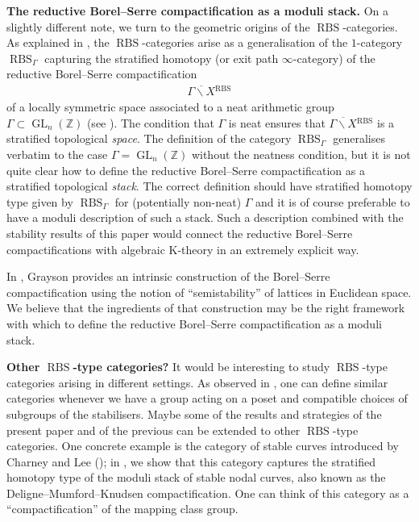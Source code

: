 \documentclass[12pt, reqno]{amsart}
\theoremstyle{plain}
\theoremstyle{definition}
\newcommand{\Z}{\mathbb Z}
\begin{document}
\medskip

\textbf{The reductive Borel--Serre compactification as a moduli stack.} On a slightly different note, we turn to the geometric origins of the $\operatorname{RBS}$-categories. As explained in \cite{ClausenOrsnesJansen}, the $\operatorname{RBS}$-categories arise as a generalisation of the $1$-category $\operatorname{RBS}_\Gamma$ capturing the stratified homotopy (or exit path $\infty$-category) of the reductive Borel--Serre compactification
\begin{align*}
\overline{\Gamma\backslash X}{}^{\operatorname{RBS}}
\end{align*}
of a locally symmetric space associated to a neat arithmetic group $\Gamma\subset \operatorname{GL}_n(\Z)$ (see \cite{OrsnesJansen,ClausenOrsnesJansen}). The condition that $\Gamma$ is neat ensures that $\overline{\Gamma\backslash X}{}^{\operatorname{RBS}}$ is a stratified topological \textit{space}. The definition of the category $\operatorname{RBS}_\Gamma$ generalises verbatim to the case $\Gamma=\operatorname{GL}_n(\Z)$ without the neatness condition, but it is not quite clear how to define the reductive Borel--Serre compactification as a stratified topological \textit{stack}. The correct definition should have stratified homotopy type given by $\operatorname{RBS}_\Gamma$ for (potentially non-neat) $\Gamma$ and it is of course preferable to have a moduli description of such a stack. Such a description combined with the stability results of this paper would connect the reductive Borel--Serre compactifications with algebraic K-theory in an extremely explicit way.

In \cite{Grayson84}, Grayson provides an intrinsic construction of the Borel--Serre compactification using the notion of ``semistability'' of lattices in Euclidean space. We believe that the ingredients of that construction may be the right framework with which to define the reductive Borel--Serre compactification as a moduli stack.

\medskip

\textbf{Other $\operatorname{RBS}$-type categories?} It would be interesting to study $\operatorname{RBS}$-type categories arising in different settings. As observed in \cite[\S 6]{OrsnesJansen}, one can define similar categories whenever we have a group acting on a poset and compatible choices of subgroups of the stabilisers. Maybe some of the results and strategies of the present paper and of the previous \cite{ClausenOrsnesJansen} can be extended to other $\operatorname{RBS}$-type categories. One concrete example is the category of stable curves introduced by Charney and Lee (\cite{CharneyLee84}); in \cite{OrsnesJansen23a}, we show that this category captures the stratified homotopy type of the moduli stack of stable nodal curves, also known as the Deligne--Mumford--Knudsen compactification. One can think of this category as a ``compactification'' of the mapping class group.
\end{document}
